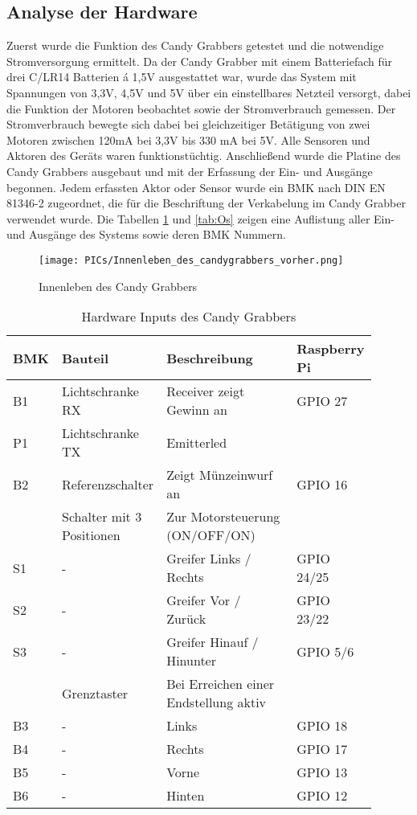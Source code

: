 \documentclass[BMR,Bachelor,ngerman]{twbook}%
\begin{document}
\subsection{Analyse der Hardware}
Zuerst wurde die Funktion des Candy Grabbers getestet und die notwendige Stromversorgung ermittelt. Da der Candy Grabber mit einem Batteriefach für drei C/LR14 Batterien á 1,5V ausgestattet war, wurde das System mit Spannungen von 3,3V, 4,5V und 5V über ein einstellbares Netzteil versorgt, dabei die Funktion der Motoren beobachtet sowie der Stromverbrauch gemessen. Der Stromverbrauch bewegte sich dabei bei gleichzeitiger Betätigung von zwei Motoren zwischen 120mA bei 3,3V bis 330 mA bei 5V. Alle Sensoren und Aktoren des Geräts waren funktionstüchtig. Anschließend wurde die Platine des Candy Grabbers ausgebaut und mit der Erfassung der Ein- und Ausgänge begonnen. Jedem erfassten Aktor oder Sensor wurde ein \ac{BMK} nach DIN EN 81346-2 zugeordnet, die für die Beschriftung der Verkabelung im Candy Grabber verwendet wurde. Die Tabellen \ref{tab:Is} und \ref{tab:Os} zeigen eine Auflistung aller Ein- und Ausgänge des Systems sowie deren BMK Nummern.
\begin{figure}[!htbp]
\centering
\texttt{[image: PICs/Innenleben\_des\_candygrabbers\_vorher.png]}
\caption{Innenleben des Candy Grabbers}\label{fig:cgopen}
\end{figure}
\begin{table}[H]
\centering
\caption{Hardware Inputs des Candy Grabbers}\label{tab:Is}
\begin{tabular}{| p{0.08\linewidth} | p{0.27\linewidth} | p{0.4\linewidth} | p{0.15\linewidth} |}\hline
\rowcolor[gray]{0.8} BMK & Bauteil & Beschreibung & Raspberry Pi\\\hline
B1 & Lichtschranke RX & Receiver zeigt Gewinn an & GPIO 27\\
P1 & Lichtschranke TX & Emitterled &  \\\hline
B2 & Referenzschalter & Zeigt Münzeinwurf an & GPIO 16\\\hline
 & Schalter mit 3 Positionen & Zur Motorsteuerung (ON/OFF/ON) &\\
S1 & - & Greifer Links / Rechts & GPIO 24/25 \\
S2 & - & Greifer Vor / Zurück & GPIO 23/22\\
S3 & - & Greifer Hinauf / Hinunter & GPIO 5/6\\\hline
 & Grenztaster & Bei Erreichen einer Endstellung aktiv&\\
B3 & - &  Links & GPIO 18\\
B4 & - &  Rechts & GPIO 17 \\
B5 & - &  Vorne& GPIO 13\\
B6 & - &  Hinten& GPIO 12\\\hline
\end{tabular}
\end{table}
\end{document}
